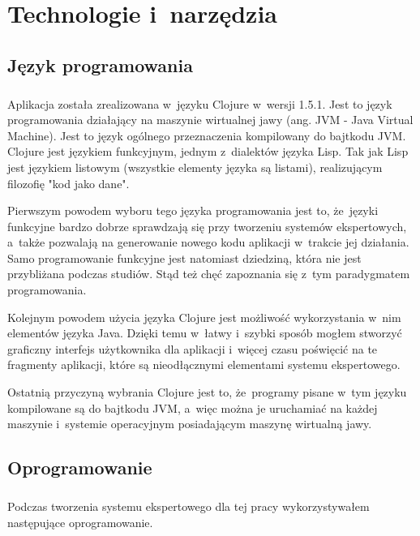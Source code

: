 \chapter{Technologie i~narzędzia}\label{chap:narzedzia}

\section{Język programowania}

\paragraph{}
Aplikacja została zrealizowana w~języku Clojure\cite{clj} w~wersji 1.5.1. Jest to język programowania działający na maszynie wirtualnej jawy (ang. JVM - Java Virtual Machine). Jest to język ogólnego przeznaczenia kompilowany do bajtkodu JVM. Clojure jest językiem funkcyjnym, jednym z~dialektów języka Lisp. Tak jak Lisp jest językiem listowym (wszystkie elementy języka są listami), realizującym filozofię "kod jako dane".

Pierwszym powodem wyboru tego języka programowania jest to, że~języki funkcyjne bardzo dobrze sprawdzają się przy tworzeniu systemów ekspertowych, a~także pozwalają na generowanie nowego kodu aplikacji w~trakcie jej działania. Samo programowanie funkcyjne jest natomiast dziedziną, która nie jest przybliżana podczas studiów. Stąd też chęć zapoznania się z~tym paradygmatem programowania.

Kolejnym powodem użycia języka Clojure jest możliwość wykorzystania w~nim elementów języka Java. Dzięki temu w~łatwy i~szybki sposób mogłem stworzyć graficzny interfejs użytkownika dla aplikacji i~więcej czasu poświęcić na te fragmenty aplikacji, które są nieodłącznymi elementami systemu ekspertowego.

Ostatnią przyczyną wybrania Clojure jest to, że~programy pisane w~tym języku kompilowane są do bajtkodu JVM, a~więc można je uruchamiać na każdej maszynie i~systemie operacyjnym posiadającym maszynę wirtualną jawy.

\section{Oprogramowanie}

\paragraph{}
Podczas tworzenia systemu ekspertowego dla tej pracy wykorzystywałem następujące oprogramowanie.

